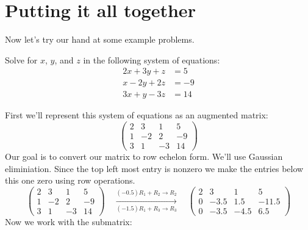 \documentclass{ximera}
\begin{document}
\section{Putting it all together}

Now let's try our hand at some example problems.


\begin{example}
  Solve for $x$, $y$, and $z$ in the following system of equations:
  \begin{align*}
    2x + 3y + z  &= 5 \\
    x -2y+ 2z &=-9\\
    3x +y- 3z &=14
  \end{align*}

\begin{explanation}
First we'll represent this system of equations as an augmented matrix:
\[
  \left(
    \begin{array}{ccc|c}
      2 & 3 & 1 & 5 \\
      1 &  -2 & 2 &-9 \\
      3 &  1 & -3 & 14
    \end{array}
  \right)
\]
Our goal is to convert our matrix to row echelon form. We'll use
Gaussian eliminiation. Since the top left most entry is nonzero we
make the entries below this one zero using row operations.
\[
  \begin{pmatrix}
    2 & 3 & 1 & 5 \\
    1 &  -2 & 2 &-9 \\
    3 &  1 & -3 & 14
  \end{pmatrix}
  \quad\xrightarrow[(-1.5) R_1 + R_3 \to R_3]{(-0.5) R_1 + R_2 \to R_2}\quad
  \begin{pmatrix}
    2 & 3 & 1 & 5 \\
    0 & -3.5 & 1.5 &-11.5 \\
    0 & -3.5 & -4.5 & 6.5
  \end{pmatrix}
\]
Now we work with the submatrix:
\begin{center}
\end{center}
\end{explanation}
\end{example}
\end{document}
